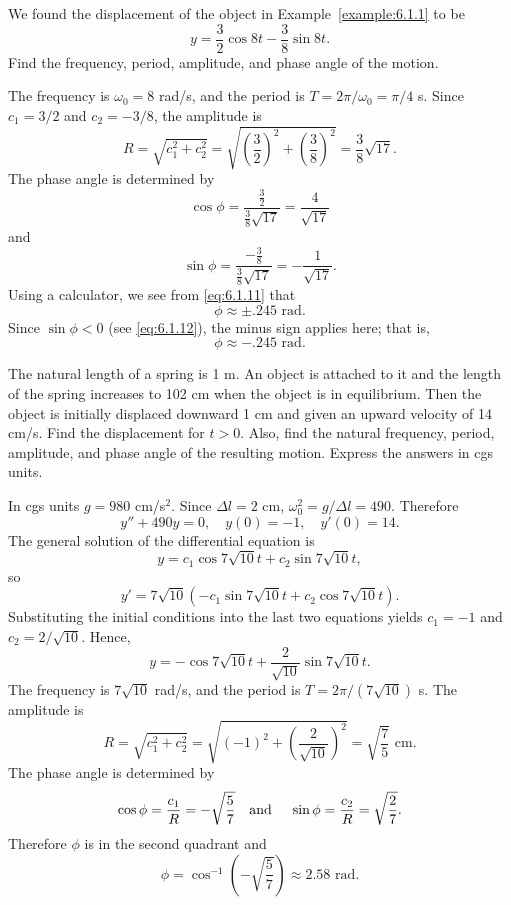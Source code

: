 \setcounter{example}{1}
\begin{example}
  \label{example:6.1.2}\rm We found the displacement of the object in Example~\ref{example:6.1.1} to
  be
  \[
    y=\frac{3}{2}\cos8t-\frac{3}{8}\sin8t.
  \]
  Find the frequency, period, amplitude, and phase angle of the motion.
\end{example}
\setcounter{equation}{10}
\begin{examplesolution}
\solution The frequency is $\omega_{0}=8$ rad/s, and the period is $T=2\pi/\omega_{0}=\pi/4$ s.
Since $c_{1}=3/2$ and $c_{2}=-3/8$, the amplitude is
\[
  R=\sqrt{c^{2}_{1}+c^{2}_{2}}=\sqrt{\left(\frac{3}{2}\right)^{2}+\left(\frac{3}{8}\right)^{2}}=\frac{3}{8}\sqrt{17}.
\]
The phase angle is determined by
\begin{equation}
  \label{eq:6.1.11}\cos\phi=\frac{\frac{3}{2}}{{\frac{3}{8}}\sqrt{17}}=\frac{4}{\sqrt{17}}
\end{equation}
and
\begin{equation}
  \label{eq:6.1.12}\sin\phi=\frac{-\frac{3}{8}}{{\frac{3}{8}}\sqrt{17}}=-\frac{1}{\sqrt{17}}.
\end{equation}
Using a calculator, we see from \eqref{eq:6.1.11} that
\[
  \phi\approx\pm.245\mbox{ rad}.
\]
Since $\sin\phi<0$ (see \eqref{eq:6.1.12}), the minus sign applies here; that is,
\[
  \phi\approx-.245\mbox{ rad}.
\]
\end{examplesolution}

\setcounter{example}{2}
\begin{example}
  \label{example:6.1.3}\rm The natural length of a spring is 1 m. An object is attached to it and
  the length of the spring increases to 102 cm when the object is in equilibrium. Then the object is
  initially displaced downward 1 cm and given an upward velocity of 14 cm/s. Find the displacement
  for $t>0$. Also, find the natural frequency, period, amplitude, and phase angle of the resulting
  motion. Express the answers in cgs units.
\end{example}
\begin{examplesolution}
\solution In cgs units $g=980$ cm/s$^{2}$. Since $\Delta l=2$ cm, $\omega_{0}^{2}=g/\Delta l=490$.
Therefore
\[
  y''+490y=0,\quad y(0)=-1,\quad y'(0)=14.
\]
The general solution of the differential equation is
\[
  y=c_{1}\cos7\sqrt{10}t+c_{2}\sin7\sqrt{10}t,
\]
so
\[
  y'=7\sqrt{10}\left(-c_{1}\sin7\sqrt{10}t+c_{2}\cos7\sqrt{10}t\right).
\]
Substituting the initial conditions into the last two equations yields $c_{1}=-1$ and
$c_{2}=2/\sqrt{10}$. Hence,
\[
  y=-\cos7\sqrt{10}t+\frac{2}{\sqrt{10}}\sin7\sqrt{10}t.
\]
The frequency is $7\sqrt{10}$ rad/s, and the period is $T=2\pi/(7\sqrt{10})$ s. The amplitude is
\[
  R=\sqrt{c_{1}^{2}+c_{2}^{2}}=\sqrt{(-1)^{2}+\left(\frac{2}{\sqrt{10}}\right)^{2}}= \sqrt{\frac{7}{5}}\mbox{ cm}.
\]
The phase angle is determined by
\[
  \cos\phi=\frac{c_{1}}{R}=-\sqrt{\frac{5}{7}}\mbox{\quad and \quad}\sin\phi= \frac{c_{2}}{R}=\sqrt{\frac{2}{7}}.
\]
Therefore $\phi$ is in the second quadrant and
\[
  \phi=\cos^{-1}\left(-\sqrt{\frac{5}{7}}\right)\approx2.58\mbox{ rad}.
\]
\end{examplesolution}

